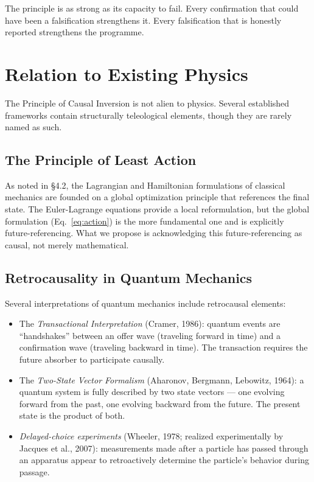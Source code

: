 \documentclass[12pt,a4paper]{article}
\begin{document}
The principle is as strong as its capacity to fail. Every confirmation that could have been a falsification strengthens it. Every falsification that is honestly reported strengthens the programme.


\section{Relation to Existing Physics}

The Principle of Causal Inversion is not alien to physics. Several established frameworks contain structurally teleological elements, though they are rarely named as such.

\subsection{The Principle of Least Action}

As noted in \S4.2, the Lagrangian and Hamiltonian formulations of classical mechanics are founded on a global optimization principle that references the final state. The Euler-Lagrange equations provide a local reformulation, but the global formulation (Eq.~\eqref{eq:action}) is the more fundamental one and is explicitly future-referencing. What we propose is acknowledging this future-referencing as causal, not merely mathematical.

\subsection{Retrocausality in Quantum Mechanics}

Several interpretations of quantum mechanics include retrocausal elements:

\begin{itemize}[leftmargin=2em]
    \item The \emph{Transactional Interpretation} (Cramer, 1986): quantum events are ``handshakes'' between an offer wave (traveling forward in time) and a confirmation wave (traveling backward in time). The transaction requires the future absorber to participate causally.
    \item The \emph{Two-State Vector Formalism} (Aharonov, Bergmann, Lebowitz, 1964): a quantum system is fully described by two state vectors --- one evolving forward from the past, one evolving backward from the future. The present state is the product of both.
    \item \emph{Delayed-choice experiments} (Wheeler, 1978; realized experimentally by Jacques et al., 2007): measurements made after a particle has passed through an apparatus appear to retroactively determine the particle's behavior during passage.
\end{itemize}
\end{document}
